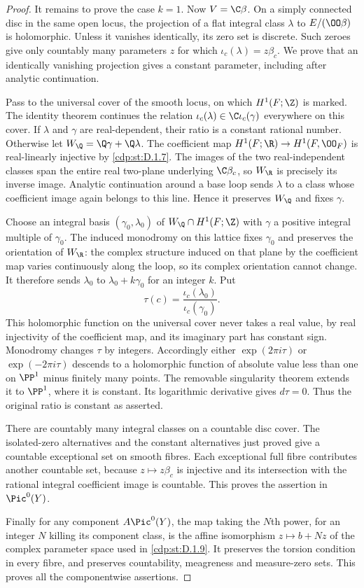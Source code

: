 \begin{proof}
It remains to prove the case $k=1$.
Now $V=\C\beta$. On a simply connected disc in the same open locus,
the projection of a flat integral class $\lambda$ to
$E/(\OO\beta)$ is holomorphic. Unless it vanishes identically,
its zero set is discrete. Such zeroes give only countably many
parameters $z$ for which $\iota_c(\lambda)=z\beta_c$.
We prove that an identically vanishing projection gives a constant
parameter, including after analytic continuation.

Pass to the universal cover of the smooth locus, on which
$H^1(F;\Z)$ is marked. The identity theorem continues the relation
$\iota_c(\lambda)\in\C\iota_c(\gamma)$ everywhere on this cover.
If $\lambda$ and $\gamma$ are real-dependent, their ratio is a
constant rational number. Otherwise let
$W_{\Q}=\Q\gamma+\Q\lambda$. The coefficient map
$H^1(F;\R)\to H^1(F,\OO_F)$ is real-linearly injective by \ref{cdp:st:D.1.7}.
The images of the two real-independent classes span the entire
real two-plane underlying $\C\beta_c$, so $W_{\R}$ is precisely
its inverse image. Analytic continuation around a base loop
sends $\lambda$ to a class whose coefficient image again belongs
to this line. Hence it preserves $W_{\Q}$ and fixes $\gamma$.

Choose an integral basis $(\gamma_0,\lambda_0)$ of
$W_{\Q}\cap H^1(F;\Z)$ with $\gamma$ a positive integral multiple
of $\gamma_0$. The induced monodromy on this lattice fixes
$\gamma_0$ and preserves the orientation of $W_{\R}$: the complex
structure induced on that plane by the coefficient map varies
continuously along the loop, so its complex orientation cannot change.
It therefore sends $\lambda_0$ to $\lambda_0+k\gamma_0$ for an
integer $k$. Put
\[
\tau(c)=\frac{\iota_c(\lambda_0)}{\iota_c(\gamma_0)}.
\]
This holomorphic function on the universal cover never takes a
real value, by real injectivity of the coefficient map, and its
imaginary part has constant sign. Monodromy changes $\tau$ by
integers. Accordingly either $\exp(2\pi i\tau)$ or
$\exp(-2\pi i\tau)$ descends to a holomorphic function of absolute
value less than one on $\PP^1$ minus finitely many points. The
removable singularity theorem extends it to $\PP^1$, where it is
constant. Its logarithmic derivative gives $d\tau=0$. Thus the
original ratio is constant as asserted.

There are countably many integral classes on a countable disc
cover. The isolated-zero alternatives and the constant alternatives
just proved give a countable exceptional set on smooth fibres.
Each exceptional full fibre contributes another countable set,
because $z\mapsto z\beta_c$ is injective and its intersection with
the rational integral coefficient image is countable. This proves
the assertion in $\Pic^0(Y)$.

Finally for any component $A\Pic^0(Y)$, the map taking the $N$th
power, for an integer $N$ killing its component class, is the affine
isomorphism $z\mapsto b+Nz$ of the complex parameter space used
in \ref{cdp:st:D.1.9}. It preserves the torsion condition in every fibre, and
preserves countability, meagreness and measure-zero sets. This
proves all the componentwise assertions.
\end{proof}

